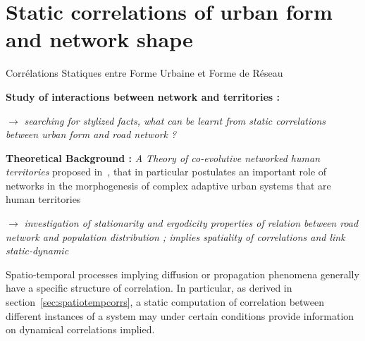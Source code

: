 

\newpage





\section[Static Correlations][Corrélations Statiques]{Static correlations of urban form and network shape}{Corrélations Statiques entre Forme Urbaine et Forme de Réseau}

\label{sec:staticcorrelations}





\textbf{Study of interactions between network and territories :}

\medskip

$\rightarrow$ \textit{searching for stylized facts, what can be learnt from static correlations between urban form and road network ?}

\bigskip

\textbf{Theoretical Background : } \textit{A Theory of co-evolutive networked human territories} proposed in~\cite{raimbault2016memoire}, that in particular postulates an important role of networks in the morphogenesis of complex adaptive urban systems that are human territories

\bigskip

$\rightarrow$ \textit{investigation of stationarity and ergodicity properties of relation between road network and population distribution ; implies spatiality of correlations and link static-dynamic}






Spatio-temporal processes implying diffusion or propagation phenomena generally have a specific structure of correlation. In particular, as derived in section~\ref{sec:spatiotempcorrs}, a static computation of correlation between different instances of a system may under certain conditions provide information on dynamical correlations implied.


